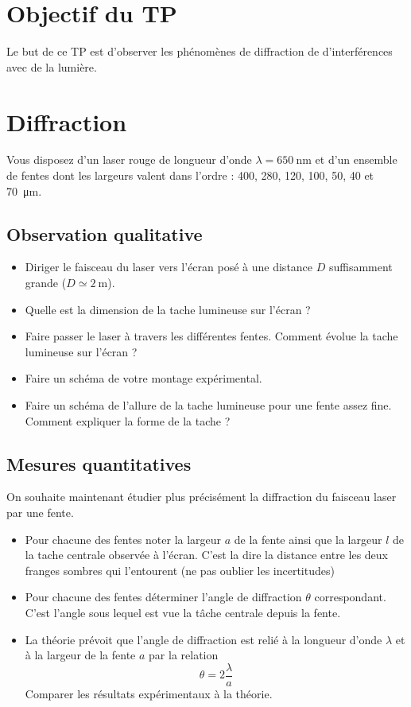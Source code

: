 \documentclass{tp}
\begin{document}

\section{Objectif du TP}
Le but de ce TP est d'observer les phénomènes de diffraction de d'interférences avec de la lumière. 

\section{Diffraction} 

Vous disposez d'un laser rouge de longueur d'onde $\lambda=\SI{650}{\nm}$ et d'un ensemble de fentes dont les largeurs valent dans l'ordre : 400, 280, 120, 100, 50, 40 et \SI{70}{\micro\meter}.
\subsection{Observation qualitative}
\begin{itemize}
\item Diriger le faisceau du laser vers l'écran posé à une distance $D$ suffisamment grande ($D\simeq\SI{2}{\m}$). 
\item Quelle est la dimension de la tache lumineuse sur l'écran ?
\item Faire passer le laser à travers les différentes fentes. Comment évolue la tache lumineuse sur l'écran ? 
\item Faire un schéma de votre montage expérimental.
\item Faire un schéma de l'allure de la tache lumineuse pour une fente assez fine. Comment expliquer la forme de la tache ?
\end{itemize}

\subsection{Mesures quantitatives}
On souhaite maintenant étudier plus précisément la diffraction du faisceau laser par une fente.
\begin{itemize}
  \item Pour chacune des fentes noter la largeur $a$ de la fente ainsi que la largeur $l$ de la tache centrale observée à l'écran. C'est la dire la distance entre les deux franges sombres qui l'entourent (ne pas oublier les incertitudes)
  \item Pour chacune des fentes déterminer l'angle de diffraction $\theta$ correspondant. C'est l'angle sous lequel est vue la tâche centrale depuis la fente.
  \item La théorie prévoit que l'angle de diffraction est relié à la longueur d'onde $\lambda$ et à la largeur de la fente $a$ par la relation 
  \begin{equation*}
    \theta = 2 \frac{\lambda}{a}
  \end{equation*}
  Comparer les résultats expérimentaux à la théorie.
\end{itemize}
\end{document}

